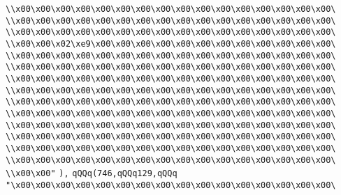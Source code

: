 \verb|\\x00\x00\x00\x00\x00\x00\x00\x00\x00\x00\x00\x00\x00\x00\x00\x00\|\newline
\verb|\\x00\x00\x00\x00\x00\x00\x00\x00\x00\x00\x00\x00\x00\x00\x00\x00\|\newline
\verb|\\x00\x00\x00\x00\x00\x00\x00\x00\x00\x00\x00\x00\x00\x00\x00\x00\|\newline
\verb|\\x00\x00\x02\xe9\x00\x00\x00\x00\x00\x00\x00\x00\x00\x00\x00\x00\|\newline
\verb|\\x00\x00\x00\x00\x00\x00\x00\x00\x00\x00\x00\x00\x00\x00\x00\x00\|\newline
\verb|\\x00\x00\x00\x00\x00\x00\x00\x00\x00\x00\x00\x00\x00\x00\x00\x00\|\newline
\verb|\\x00\x00\x00\x00\x00\x00\x00\x00\x00\x00\x00\x00\x00\x00\x00\x00\|\newline
\verb|\\x00\x00\x00\x00\x00\x00\x00\x00\x00\x00\x00\x00\x00\x00\x00\x00\|\newline
\verb|\\x00\x00\x00\x00\x00\x00\x00\x00\x00\x00\x00\x00\x00\x00\x00\x00\|\newline
\verb|\\x00\x00\x00\x00\x00\x00\x00\x00\x00\x00\x00\x00\x00\x00\x00\x00\|\newline
\verb|\\x00\x00\x00\x00\x00\x00\x00\x00\x00\x00\x00\x00\x00\x00\x00\x00\|\newline
\verb|\\x00\x00\x00\x00\x00\x00\x00\x00\x00\x00\x00\x00\x00\x00\x00\x00\|\newline
\verb|\\x00\x00\x00\x00\x00\x00\x00\x00\x00\x00\x00\x00\x00\x00\x00\x00\|\newline
\verb|\\x00\x00\x00\x00\x00\x00\x00\x00\x00\x00\x00\x00\x00\x00\x00\x00\|\newline
\verb|\\x00\x00"|\newline
\verb|),|\newline
\verb|qQQq(746,qQQq129,qQQq|\newline
\verb|"\x00\x00\x00\x00\x00\x00\x00\x00\x00\x00\x00\x00\x00\x00\x00\x00\|\newline
